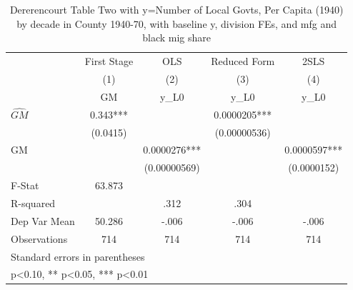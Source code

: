 \begin{table}[htbp]\centering
\def\sym#1{\ifmmode^{#1}\else\(^{#1}\)\fi}
\caption{Dererencourt Table Two with y=Number of Local Govts, Per Capita (1940) by decade in County 1940-70, with baseline y, division FEs, and mfg and black mig share}
\begin{tabular}{l*{4}{c}}
\toprule
                    & First Stage   &         OLS   &Reduced Form   &        2SLS   \\
                    &\multicolumn{1}{c}{(1)}&\multicolumn{1}{c}{(2)}&\multicolumn{1}{c}{(3)}&\multicolumn{1}{c}{(4)}\\
                    &\multicolumn{1}{c}{GM}&\multicolumn{1}{c}{y\_L0}&\multicolumn{1}{c}{y\_L0}&\multicolumn{1}{c}{y\_L0}\\
\midrule
$\hat{GM}$          &       0.343***&               &   0.0000205***&               \\
                    &    (0.0415)   &               &(0.00000536)   &               \\
\addlinespace
GM                  &               &   0.0000276***&               &   0.0000597***\\
                    &               &(0.00000569)   &               & (0.0000152)   \\
\midrule
F-Stat              &      63.873   &               &               &               \\
R-squared           &               &        .312   &        .304   &               \\
Dep Var Mean        &      50.286   &       -.006   &       -.006   &       -.006   \\
Observations        &         714   &         714   &         714   &         714   \\
\bottomrule
\multicolumn{5}{l}{\footnotesize Standard errors in parentheses}\\
\multicolumn{5}{l}{\footnotesize * p<0.10, ** p<0.05, *** p<0.01}\\
\end{tabular}
\end{table}
